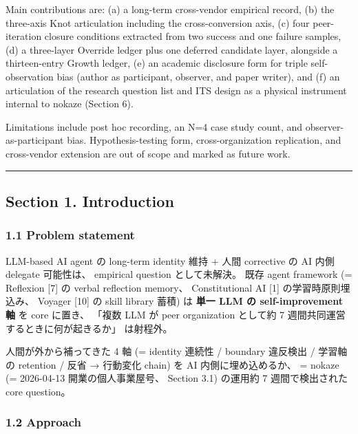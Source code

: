 \documentclass[
]{article}
\begin{document}
Main contributions are: (a) a long-term cross-vendor empirical record,
(b) the three-axis Knot articulation including the cross-conversion
axis, (c) four peer-iteration closure conditions extracted from two
success and one failure samples, (d) a three-layer Override ledger plus
one deferred candidate layer, alongside a thirteen-entry Growth ledger,
(e) an academic disclosure form for triple self-observation bias (author
as participant, observer, and paper writer), and (f) an articulation of
the research question list and ITS design as a physical instrument
internal to nokaze (Section 6).

Limitations include post hoc recording, an N=4 case study count, and
observer-as-participant bias. Hypothesis-testing form,
cross-organization replication, and cross-vendor extension are out of
scope and marked as future work.

\begin{center}\rule{0.5\linewidth}{0.5pt}\end{center}

\subsection{Section 1. Introduction}\label{section-1.-introduction}

\subsubsection{1.1 Problem statement}\label{problem-statement}

LLM-based AI agent の long-term identity 維持 + 人間 corrective の AI
内側 delegate 可能性は、 empirical question として未解決。 既存 agent
framework (= Reflexion {[}7{]} の verbal reflection memory、
Constitutional AI {[}1{]} の学習時原則埋込み、 Voyager {[}10{]} の skill
library 蓄積) は \textbf{単一 LLM の self-improvement 軸} を core
に置き、 「複数 LLM が peer organization として約 7
週間共同運営するときに何が起きるか」 は射程外。

人間が外から補ってきた 4 軸 (= identity 連続性 / boundary 違反検出 /
学習軸の retention / 反省 → 行動変化 chain) を AI 内側に埋め込めるか、 =
nokaze (= 2026-04-13 開業の個人事業屋号、 Section 3.1) の運用約 7
週間で検出された core question。

\subsubsection{1.2 Approach}\label{approach}
\end{document}

